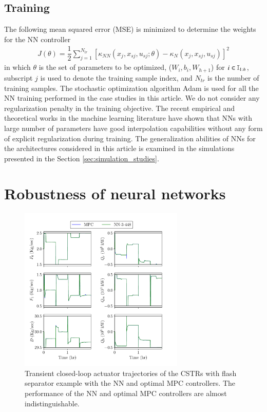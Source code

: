 \documentclass[preprint,5p, twocolumn, authoryear]{elsarticle}
\begin{document}
\subsection{Training}

The following mean squared error (MSE) is minimized to determine the weights for
the NN controller
\begin{align}
    J (\theta) = \dfrac{1}{2}\sum_{j=1}^{N_{tr}} 
[\kappa_{NN}(x_j, x_{sj}, u_{sj}; \theta) - \kappa_N(x_j, x_{sj}, u_{sj})]^2 
\end{align}
in which $\theta$ is the set of parameters to be optimized, ($W_i, b_i,
W_{h+1}$) for $i \in \mathbb{I}_{1:h}$, subscript $j$ is used to denote the training
sample index, and $N_{tr}$ is the number of training samples. The stochastic
optimization algorithm Adam \citep*{kingma:ba:2014} is used for all the NN
training performed in the case studies in this article. We do not consider any
regularization penalty in the training objective. The recent empirical and
theoretical works in the machine learning literature have shown that NNs with
large number of parameters have good interpolation capabilities
\citep*{belkin:hsu:ma:mandal:2019, zhang:bengio:hardt:recht:vinyals:2017,
arora:simon:hu:li:wang:2019, allen-zhu:li:liang:2019} without any form of
explicit regularization during training. The generalization abilities of NNs for
the architectures considered in this article is examined in the simulations
presented in the Section \ref{sec:simulation_studies}.

\section{Robustness of neural networks} \label{sec:robustness}

\begin{figure}[!h]
    \centering
	\includegraphics[page=1, width=0.7\textwidth,
		height=0.5\textheight]{cstrs_comparision_plots.pdf}    
        \caption{Transient closed-loop actuator trajectories of the CSTRs with
        flash separator example with the NN and optimal MPC controllers. The
        performance of the NN and optimal MPC controllers are almost
        indistinguishable.}   
    \label{fig:cl_cstrs_inputs}
\end{figure}
\end{document}
